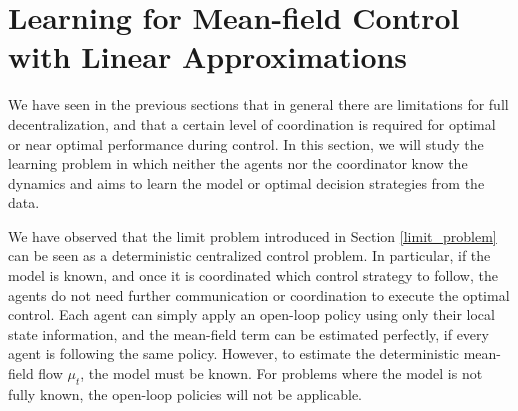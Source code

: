 \documentclass[twoside,11pt]{article}
\begin{document}







\section{Learning for Mean-field Control with Linear Approximations} \label{learning_sec}

We have seen in the previous sections that in general there are limitations for full decentralization, and that a certain level of coordination is required for optimal or near optimal performance during control. In this section, we will study the learning problem in which neither the agents nor the coordinator know the dynamics and aims to learn the model or optimal decision strategies from the data.

We have observed that the limit problem introduced in Section \ref{limit_problem} can be seen as a deterministic centralized control problem. In particular, if the model is known, and once it is coordinated which control strategy to follow, the agents do not  need further communication or coordination  to execute the optimal control. Each agent can simply apply an open-loop policy using only their local state information, and the mean-field term can be estimated perfectly, if every agent is following the same policy. However, to estimate the deterministic mean-field flow $\mu_t$, the model must be known. For problems where the model is not fully known, the open-loop policies will not be applicable. 
\end{document}
